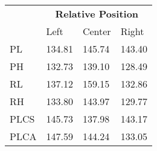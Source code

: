 \begin{table}[]
\begin{tabular}{llll}
\hline
     & \multicolumn{3}{c}{\textbf{Relative Position}} \\ \cline{2-4} 
     & Left           & Center        & Right         \\ \cline{2-4} 
PL   & 134.81         & 145.74        & 143.40        \\
PH   & 132.73         & 139.10        & 128.49        \\
RL   & 137.12         & 159.15        & 132.86        \\
RH   & 133.80         & 143.97        & 129.77        \\
PLCS & 145.73         & 137.98        & 143.17        \\
PLCA & 147.59         & 144.24        & 133.05        \\ \cline{1-3}
\end{tabular}
\end{table}